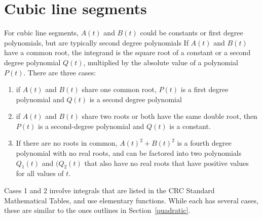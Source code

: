 \documentclass[12pt]{article}
\begin{document}
\section{Cubic line segments}\label{cubic}

For cubic line segments, $A(t)$ and $B(t)$ could be constants or
first degree polynomials, but are typically second degree
polynomials If $A(t)$ and $B(t)$ have a common root, the
integrand is the square root of a constant or a second degree
polynomial $Q(t)$, multiplied by the absolute value of a polynomial
$P(t)$. There are three cases:
\begin{enumerate}
  \item if $A(t)$ and $B(t)$ share one common root, $P(t)$ is a first
	degree polynomial and $Q(t)$ is a second degree polynomial
  \item if $A(t)$ and $B(t)$ share two roots or both have the same
	double root, then $P(t)$ is a second-degree polynomial and
	$Q(t)$ is a constant.
  \item If there are no roots in common, $A(t)^2 + B(t)^2$ is a
	fourth degree polynomial with no real roots, and can be
	factored into two polynomials $Q_1(t)$ and $(Q_2(t)$ that
	also have no real roots that have positive values for all values
	of $t$.
\end{enumerate}
Cases 1 and 2 involve integrals that are listed in the CRC
Standard Mathematical Tables, and use elementary
functions. While each has several cases, these are similar to
the ones outlines in Section~\ref{quadratic}.
\end{document}
